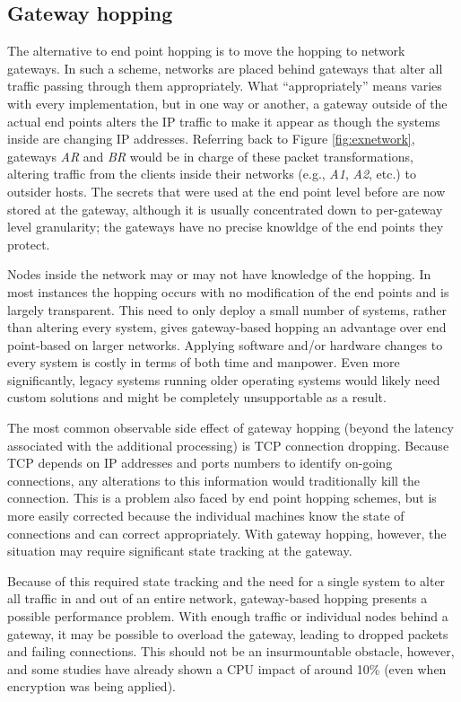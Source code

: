 \subsection{Gateway hopping}
\label{sec:gateway_hopping}
\par The alternative to end point hopping is to move the hopping to network gateways. In such a scheme, networks are placed behind gateways that alter all traffic passing through them appropriately. What ``appropriately'' means varies with every implementation, but in one way or another, a gateway outside of the actual end points alters the IP traffic to make it appear as though the systems inside are changing IP addresses. Referring back to Figure \ref{fig:exnetwork}, gateways \textit{AR} and \textit{BR} would be in charge of these packet transformations, altering traffic from the clients inside their networks (e.g., \textit{A1}, \textit{A2}, etc.) to outsider hosts. The secrets that were used at the end point level before are now stored at the gateway, although it is usually concentrated down to per-gateway level granularity; the gateways have no precise knowldge of the end points they protect.

\par Nodes inside the network may or may not have knowledge of the hopping. In most instances the hopping occurs with no modification of the end points and is largely transparent.  This need to only deploy a small number of systems, rather than altering every system, gives gateway-based hopping an advantage over end point-based on larger networks. Applying software and/or hardware changes to every system is costly in terms of both time and manpower. Even more significantly, legacy systems running older operating systems would likely need custom solutions and might be completely unsupportable as a result.

\par The most common observable side effect of gateway hopping (beyond the latency associated with the additional processing) is TCP connection dropping. Because TCP depends on IP addresses and ports numbers to identify on-going connections, any alterations to this information would traditionally kill the connection. This is a problem also faced by end point hopping schemes, but is more easily corrected because the individual machines know the state of connections and can correct appropriately. With gateway hopping, however, the situation may require significant state tracking at the gateway.

\par Because of this required state tracking and the need for a single system to alter all traffic in and out of an entire network, gateway-based hopping presents a possible performance problem. With enough traffic or individual nodes behind a gateway, it may be possible to overload the gateway, leading to dropped packets and failing connections. This should not be an insurmountable obstacle, however, and some studies have already shown a CPU impact of around 10\% \cite{TAO} (even when encryption was being applied).

